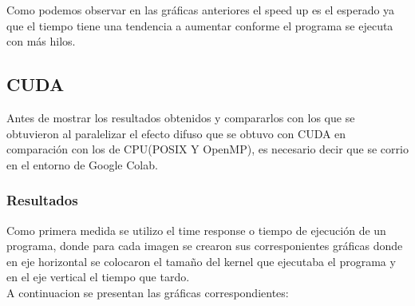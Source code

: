 \documentclass{IEEEtran}
\begin{document}
Como podemos observar en las gráficas anteriores el speed up es el esperado ya que el tiempo tiene una tendencia a aumentar conforme el programa se ejecuta con más hilos.\\


\subsection{CUDA}
Antes de mostrar los resultados obtenidos y compararlos con los que se obtuvieron al paralelizar el efecto difuso que se obtuvo con CUDA en comparación con los de CPU(POSIX Y OpenMP), es necesario decir que se corrio en el entorno de Google Colab. 


\subsubsection{Resultados}
Como primera medida se utilizo el time response o tiempo de ejecución de un programa, donde para cada imagen se crearon sus corresponientes gráficas donde en eje horizontal se colocaron el tamaño del kernel que ejecutaba el programa y en el eje vertical el tiempo que tardo.\\
A continuacion se presentan las gráficas correspondientes:
\end{document}
